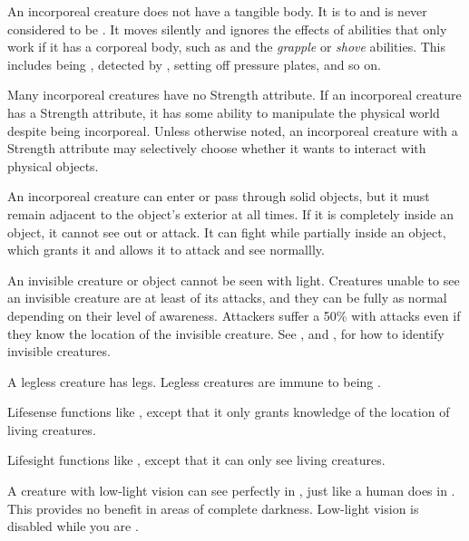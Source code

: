         An incorporeal creature does not have a tangible body.
        It is  to  and is never considered to be \squeezing.
        It moves silently and ignores the effects of abilities that only work if it has a corporeal body, such as  and the \textit{grapple} or \textit{shove} abilities.
        This includes being \grappled, detected by , setting off pressure plates, and so on.

        Many incorporeal creatures have no Strength attribute.
        If an incorporeal creature has a Strength attribute, it has some ability to manipulate the physical world despite being incorporeal.
        Unless otherwise noted, an incorporeal creature with a Strength attribute may selectively choose whether it wants to interact with physical objects.

        An incorporeal creature can enter or pass through solid objects, but it must remain adjacent to the object's exterior at all times.
        If it is completely inside an object, it cannot see out or attack.
        It can fight while partially inside an object, which grants it  and allows it to attack and see normallly.

        An invisible creature or object cannot be seen with light.
        Creatures unable to see an invisible creature are at least \partiallyunaware of its attacks, and they can be fully \unaware as normal depending on their level of awareness.
        Attackers suffer a 50\%  with  attacks even if they know the location of the invisible creature.
        See , and , for how to identify invisible creatures.

        A legless creature has legs.
        Legless creatures are immune to being \prone.

        Lifesense functions like , except that it only grants knowledge of the location of living creatures.

        Lifesight functions like , except that it can only see living creatures.

        A creature with low-light vision can see perfectly in , just like a human does in .
        This provides no benefit in areas of complete darkness.
        Low-light vision is disabled while you are \dazzled.

